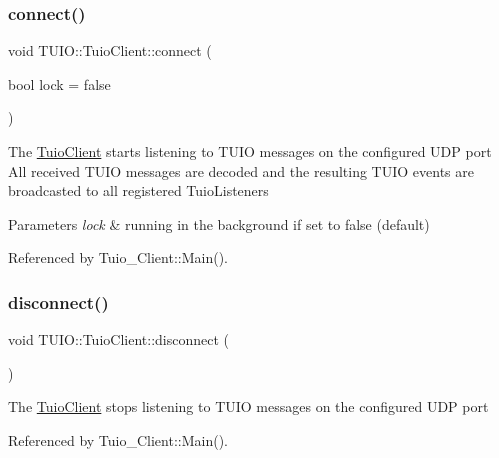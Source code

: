 \subsubsection{\texorpdfstring{connect()}{connect()}}
{\footnotesize\ttfamily void T\+U\+I\+O\+::\+Tuio\+Client\+::connect (\begin{DoxyParamCaption}\item[{bool}]{lock = {\ttfamily false} }\end{DoxyParamCaption})}

The \hyperlink{class_t_u_i_o_1_1_tuio_client}{Tuio\+Client} starts listening to T\+U\+IO messages on the configured U\+DP port All received T\+U\+IO messages are decoded and the resulting T\+U\+IO events are broadcasted to all registered Tuio\+Listeners


\begin{DoxyParams}{Parameters}
{\em lock} & running in the background if set to false (default) \\
\hline
\end{DoxyParams}


Referenced by Tuio\+\_\+\+Client\+::\+Main().

\mbox{\label{class_t_u_i_o_1_1_tuio_client_a4c2291700e637ae6e1ceb55887003500}} 
\subsubsection{\texorpdfstring{disconnect()}{disconnect()}}
{\footnotesize\ttfamily void T\+U\+I\+O\+::\+Tuio\+Client\+::disconnect (\begin{DoxyParamCaption}{ }\end{DoxyParamCaption})}

The \hyperlink{class_t_u_i_o_1_1_tuio_client}{Tuio\+Client} stops listening to T\+U\+IO messages on the configured U\+DP port 

Referenced by Tuio\+\_\+\+Client\+::\+Main().

\mbox{\label{class_t_u_i_o_1_1_tuio_client_a2d8516d662e711d82eb376a7d558ff20}} 
